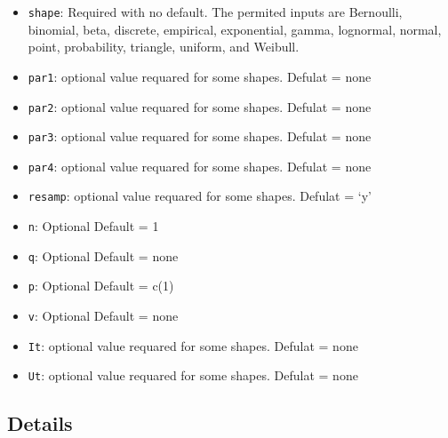 \documentclass[
]{article}
\providecommand{\tightlist}{%
  \setlength{\itemsep}{0pt}\setlength{\parskip}{0pt}}
\begin{document}
\begin{itemize}
\tightlist
\item
  \texttt{shape}: Required with no default. The permited inputs are
  Bernoulli, binomial, beta, discrete, empirical, exponential, gamma,
  lognormal, normal, point, probability, triangle, uniform, and Weibull.
\item
  \texttt{par1}: optional value requared for some shapes. Defulat = none
\item
  \texttt{par2}: optional value requared for some shapes. Defulat = none
\item
  \texttt{par3}: optional value requared for some shapes. Defulat = none
\item
  \texttt{par4}: optional value requared for some shapes. Defulat = none
\item
  \texttt{resamp}: optional value requared for some shapes. Defulat =
  `y'
\item
  \texttt{n}: Optional Default = 1
\item
  \texttt{q}: Optional Default = none
\item
  \texttt{p}: Optional Default = c(1)
\item
  \texttt{v}: Optional Default = none
\item
  \texttt{It}: optional value requared for some shapes. Defulat = none
\item
  \texttt{Ut}: optional value requared for some shapes. Defulat = none
\end{itemize}

\hypertarget{details-12}{%
\subsection{Details}\label{details-12}}
\end{document}
